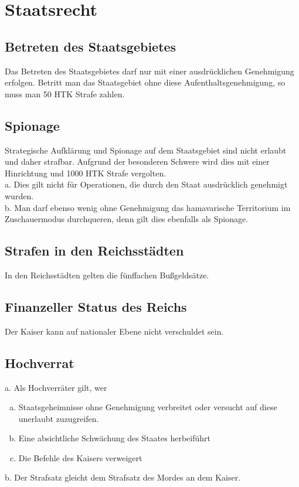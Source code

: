\documentclass{article}
\begin{document}
\section{Staatsrecht}

\subsection{Betreten des Staatsgebietes}
Das Betreten des Staatsgebietes darf nur mit einer ausdrücklichen Genehmigung erfolgen. Betritt man das Staatsgebiet ohne diese Aufenthaltsgenehmigung, so muss man 50 HTK Strafe zahlen.

\subsection{Spionage}
Strategische Aufklärung und Spionage auf dem Staatsgebiet sind nicht erlaubt und daher strafbar. Aufgrund der besonderen Schwere wird dies mit einer Hinrichtung und 1000 HTK Strafe vergolten.\\
a. Dies gilt nicht für Operationen, die durch den Staat ausdrücklich genehmigt wurden. \\
b. Man darf ebenso wenig ohne Genehmigung das hamavarische Territorium im Zuschauermodus durchqueren, denn gilt dies ebenfalls als Spionage.

\subsection{Strafen in den Reichsstädten}
In den Reichsstädten gelten die fünffachen Bußgeldsätze.

\subsection{Finanzeller Status des Reichs}
Der Kaiser kann auf nationaler Ebene nicht verschuldet sein.

\subsection{Hochverrat}
a.	Als Hochverräter gilt, wer
\begin{enumerate}[a)]
	\item Staatsgeheimnisse ohne Genehmigung verbreitet oder versucht auf diese unerlaubt zuzugreifen.
	\item Eine absichtliche Schwächung des Staates herbeiführt
	\item Die Befehle des Kaisers verweigert
\end{enumerate}
b.	Der Strafsatz gleicht dem Strafsatz des Mordes an dem Kaiser.
\end{document}

